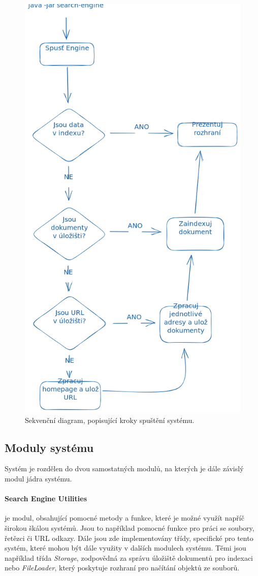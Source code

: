 \documentclass{article}
\begin{document}
\begin{figure}
    \centering
    \includegraphics[width=0.7\columnwidth]{img/sequence-diagram.png}
    \caption{Sekvenční diagram, popisující kroky spuštění systému.}
    \label{fig:startup-sequence-diagram}
\end{figure}

\subsection{Moduly systému}
Systém je rozdělen do dvou samostatných modulů, na kterých je dále závislý modul jádra systému.

\paragraph{Search Engine Utilities} je modul, obsahující pomocné metody a funkce, které je možné využít napříč širokou škálou systémů. Jsou to například pomocné funkce pro práci se soubory, řetězci či URL odkazy. Dále jsou zde implementovány třídy, specifické pro tento systém, které mohou být dále využity v dalších modulech systému. Těmi jsou například třída \textit{Storage}, zodpovědná za správu úložiště dokumentů pro indexaci nebo \textit{FileLoader}, který poskytuje rozhraní pro načítání objektů ze souborů.
\end{document}
